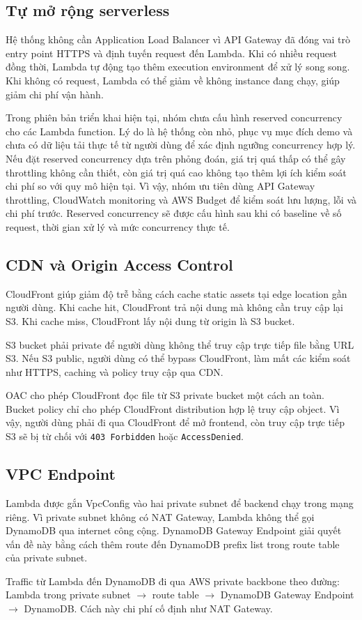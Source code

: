\subsection{Tự mở rộng serverless}

Hệ thống không cần Application Load Balancer vì API Gateway đã đóng vai trò entry point HTTPS và định tuyến request đến Lambda. Khi có nhiều request đồng thời, Lambda tự động tạo thêm execution environment để xử lý song song. Khi không có request, Lambda có thể giảm về không instance đang chạy, giúp giảm chi phí vận hành.

Trong phiên bản triển khai hiện tại, nhóm chưa cấu hình reserved concurrency cho các Lambda function. Lý do là hệ thống còn nhỏ, phục vụ mục đích demo và chưa có dữ liệu tải thực tế từ người dùng để xác định ngưỡng concurrency hợp lý. Nếu đặt reserved concurrency dựa trên phỏng đoán, giá trị quá thấp có thể gây throttling không cần thiết, còn giá trị quá cao không tạo thêm lợi ích kiểm soát chi phí so với quy mô hiện tại. Vì vậy, nhóm ưu tiên dùng API Gateway throttling, CloudWatch monitoring và AWS Budget để kiểm soát lưu lượng, lỗi và chi phí trước. Reserved concurrency sẽ được cấu hình sau khi có baseline về số request, thời gian xử lý và mức concurrency thực tế.

\subsection{CDN và Origin Access Control}

CloudFront giúp giảm độ trễ bằng cách cache static assets tại edge location gần người dùng. Khi cache hit, CloudFront trả nội dung mà không cần truy cập lại S3. Khi cache miss, CloudFront lấy nội dung từ origin là S3 bucket.

S3 bucket phải private để người dùng không thể truy cập trực tiếp file bằng URL S3. Nếu S3 public, người dùng có thể bypass CloudFront, làm mất các kiểm soát như HTTPS, caching và policy truy cập qua CDN.

OAC cho phép CloudFront đọc file từ S3 private bucket một cách an toàn. Bucket policy chỉ cho phép CloudFront distribution hợp lệ truy cập object. Vì vậy, người dùng phải đi qua CloudFront để mở frontend, còn truy cập trực tiếp S3 sẽ bị từ chối với \texttt{403 Forbidden} hoặc \texttt{AccessDenied}.

\subsection{VPC Endpoint}

Lambda được gắn VpcConfig vào hai private subnet để backend chạy trong mạng riêng. Vì private subnet không có NAT Gateway, Lambda không thể gọi DynamoDB qua internet công cộng. DynamoDB Gateway Endpoint giải quyết vấn đề này bằng cách thêm route đến DynamoDB prefix list trong route table của private subnet.

Traffic từ Lambda đến DynamoDB đi qua AWS private backbone theo đường: Lambda trong private subnet $\rightarrow$ route table $\rightarrow$ DynamoDB Gateway Endpoint $\rightarrow$ DynamoDB. Cách này chi phí cố định như NAT Gateway.
